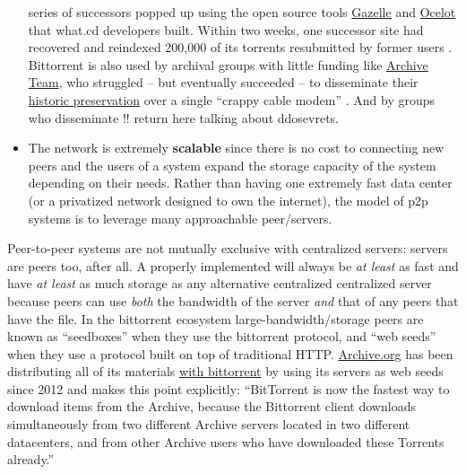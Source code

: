 \documentclass[11pt]{article}
\begin{document}
\begin{multicols}{2}
\begin{itemize}
  series of successors popped up using the open source tools
  \href{https://github.com/WhatCD/Gazelle}{Gazelle} and
  \href{https://github.com/WhatCD/Ocelot}{Ocelot} that what.cd
  developers built. Within two weeks, one successor site had recovered
  and reindexed 200,000 of its torrents resubmitted by former users \cite{vandersarWhatCdDead2016} . Bittorrent is also used by archival
  groups with little funding like
  \href{https://wiki.archiveteam.org/index.php/Main_Page}{Archive Team},
  who struggled -- but eventually succeeded -- to disseminate their
  \href{https://wiki.archiveteam.org/index.php/GeoCities_Project}{historic
  preservation} over a single ``crappy cable modem'' \cite{scottGeocitiesTorrentUpdate2010} . And by groups who disseminate !!
  return here talking about ddosevrets.
\item
  The network is extremely \textbf{scalable} since there is no cost to
  connecting new peers and the users of a system expand the storage
  capacity of the system depending on their needs. Rather than having
  one extremely fast data center (or a privatized network designed to
  own the internet), the model of p2p systems is to leverage many
  approachable peer/servers.
\end{itemize}

Peer-to-peer systems are not mutually exclusive with centralized
servers: servers are peers too, after all. A properly implemented will
always be \emph{at least} as fast and have \emph{at least} as much
storage as any alternative centralized centralized server because peers
can use \emph{both} the bandwidth of the server \emph{and} that of any
peers that have the file. In the bittorrent ecosystem
large-bandwidth/storage peers are known as ``seedboxes''\cite{rossiPeekingBitTorrentSeedbox2014}  when they use the bittorrent
protocol, and ``web seeds''\cite{hoffmanHTTPBasedSeedingSpecification}  when they use a protocol built
on top of traditional HTTP. \href{https://archive.org}{Archive.org} has
been distributing all of its materials
\href{https://archive.org/details/bittorrent}{with bittorrent} by using
its servers as web seeds since 2012 and makes this point explicitly:
``BitTorrent is now the fastest way to download items from the Archive,
because the Bittorrent client downloads simultaneously from two
different Archive servers located in two different datacenters, and from
other Archive users who have downloaded these Torrents already.'' \cite{kahle000000Torrents2012} 


\end{multicols}
\end{document}
